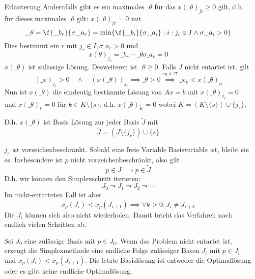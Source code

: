 \documentclass[a4paper]{scrartcl}
\numberwithin{equation}{section}
\begin{document}
\begin{note}{Erläuterung}
	Andernfalls gibt es ein maximales $\_\theta$ für das $x(\_\theta)_{ji} \ge 0$ gilt, d.h. für dieses maximales $\_\theta$ gilt: $x(\_\theta)_{ji} = 0$ mit 
	\[
		\_\theta = \f {\_b_r}{\sigma \_a_r} = \min \{\f{\_b_i}{\sigma \_a_i} : i : j_i\in I \land \sigma \_a_i > 0\}
	\]
	Dies bestimmt ein $r$ mit $j_r\in I, \sigma \_a_r > 0$ und
	\begin{equation}
		\label{eq:5.17}
		x(\theta)_{j_r} = \_b_r - \_\theta \sigma \_a_r = 0
	\end{equation}
	$x(\_\theta)$ ist zulässige Lösung.
	Desweiteren ist $\_\theta \ge 0$.
	Falls $J$ nicht entartet ist, gilt
	\[
		(\_x)_{j_r} > 0 \quad \land \quad (x(\_\theta))_{j_r} \implies \_\theta > 0 \stackrel{eq:5.17}\implies \_x_p < x(\_\theta)_p
	\]
	Nun ist $x(\_\theta)$ die eindeutig bestimmte Lösung von $Ax=b$ mit $x(\_\theta)_{j_r}=0$ und $x(\_\theta)_k = 0$ für $k\in K\setminus \{s\}$, d.h. $x(\_\theta)_{\tilde K} = 0$ wobei $K=(K\setminus \{s\})\cup \{j_r\}$.

	D.h. $x(\_\theta)$ ist Basis Lösung zur jeder Basis $\tilde J$ mit
	\[
		\tilde J = (J\setminus \{j_r\}) \cup \{s\}
	\]
\end{note}

\begin{note}
	$j_r$ ist vorzeichenbeschränkt.
	Sobald eine freie Variable Basisvariable ist, bleibt sie es.
	Insbesondere ist $p$ nicht vorzeichenbeschränkt, also gilt
	\[
		p\in J \implies p\in \tilde J
	\]
	D.h. wir können den Simplexschritt iterieren:
	\[
		J_0 \leadsto J_1 \leadsto J_2 \leadsto \dotsb
	\]
	Im nicht-entarteten Fall ist aber
	\[
		x_p(J_i) < x_p(J_{i+1}) \implies \forall k>0  : J_i \neq J_{i+k}
	\]
	Die $J_i$ können sich also nicht wiederholen.
	Damit bricht das Verfahren nach endlich vielen Schritten ab.
\end{note}

\begin{st}
	\label{st:5.6}
	Sei $J_0$ eine zulässige Basis mit $p\in J_0$.
	Wenn das Problem nicht entartet ist, erzeugt die Simplexmethode eine endliche Folge zulässiger Basen $J_i$ mit $p\in J_i$ und $x_p(J_i) < x_p(J_{i+1})$.
	Die letzte Basislösung ist entweder die Optimallösung oder es gibt keine endliche Optimallösung.
\end{st}
\end{document}
